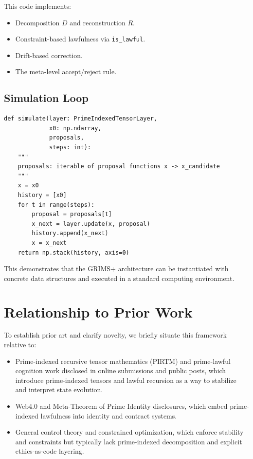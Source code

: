 \documentclass[11pt]{article}
\begin{document}
This code implements:
\begin{itemize}
  \item Decomposition \(D\) and reconstruction \(R\).
  \item Constraint-based lawfulness via \texttt{is\_lawful}.
  \item Drift-based correction.
  \item The meta-level accept/reject rule.
\end{itemize}

\subsection{Simulation Loop}

\begin{verbatim}
def simulate(layer: PrimeIndexedTensorLayer,
             x0: np.ndarray,
             proposals,
             steps: int):
    """
    proposals: iterable of proposal functions x -> x_candidate
    """
    x = x0
    history = [x0]
    for t in range(steps):
        proposal = proposals[t]
        x_next = layer.update(x, proposal)
        history.append(x_next)
        x = x_next
    return np.stack(history, axis=0)
\end{verbatim}

This demonstrates that the GRIMS+ architecture can be instantiated with concrete data structures and executed in a standard computing environment.

\section{Relationship to Prior Work}

To establish prior art and clarify novelty, we briefly situate this framework relative to:
\begin{itemize}
  \item Prime-indexed recursive tensor mathematics (PIRTM) and prime-lawful cognition work disclosed in online submissions and public posts, which introduce prime-indexed tensors and lawful recursion as a way to stabilize and interpret state evolution.%
  \item Web4.0 and Meta-Theorem of Prime Identity disclosures, which embed prime-indexed lawfulness into identity and contract systems.%
  \item General control theory and constrained optimization, which enforce stability and constraints but typically lack prime-indexed decomposition and explicit ethics-as-code layering.
\end{itemize}
\end{document}
